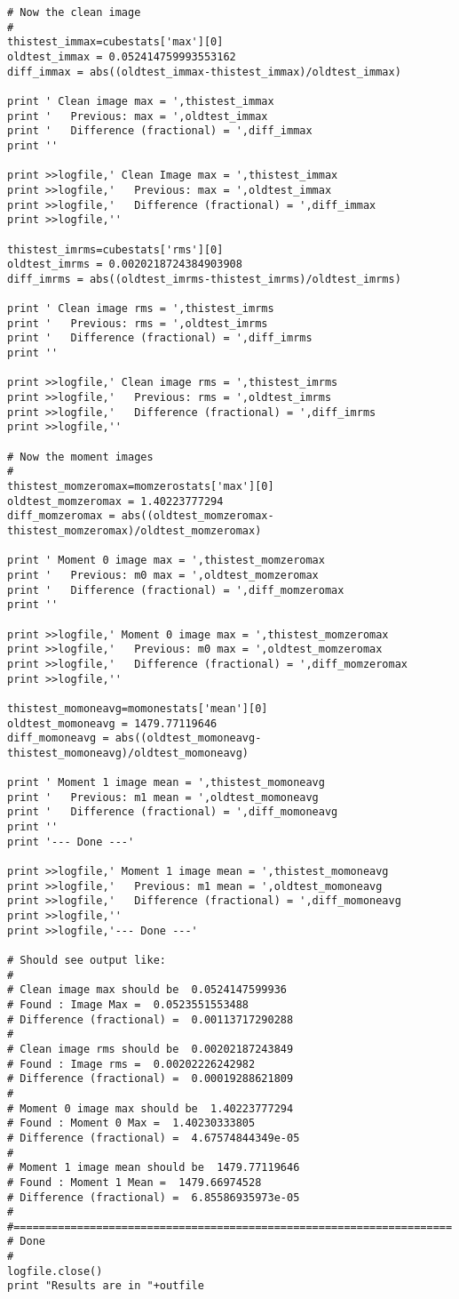 \begin{verbatim}
# Now the clean image
#
thistest_immax=cubestats['max'][0]
oldtest_immax = 0.052414759993553162
diff_immax = abs((oldtest_immax-thistest_immax)/oldtest_immax)

print ' Clean image max = ',thistest_immax
print '   Previous: max = ',oldtest_immax
print '   Difference (fractional) = ',diff_immax
print ''

print >>logfile,' Clean Image max = ',thistest_immax
print >>logfile,'   Previous: max = ',oldtest_immax
print >>logfile,'   Difference (fractional) = ',diff_immax
print >>logfile,''

thistest_imrms=cubestats['rms'][0]
oldtest_imrms = 0.0020218724384903908
diff_imrms = abs((oldtest_imrms-thistest_imrms)/oldtest_imrms)

print ' Clean image rms = ',thistest_imrms
print '   Previous: rms = ',oldtest_imrms
print '   Difference (fractional) = ',diff_imrms
print ''

print >>logfile,' Clean image rms = ',thistest_imrms
print >>logfile,'   Previous: rms = ',oldtest_imrms
print >>logfile,'   Difference (fractional) = ',diff_imrms
print >>logfile,''

# Now the moment images
#
thistest_momzeromax=momzerostats['max'][0]
oldtest_momzeromax = 1.40223777294
diff_momzeromax = abs((oldtest_momzeromax-thistest_momzeromax)/oldtest_momzeromax)

print ' Moment 0 image max = ',thistest_momzeromax
print '   Previous: m0 max = ',oldtest_momzeromax
print '   Difference (fractional) = ',diff_momzeromax
print ''

print >>logfile,' Moment 0 image max = ',thistest_momzeromax
print >>logfile,'   Previous: m0 max = ',oldtest_momzeromax
print >>logfile,'   Difference (fractional) = ',diff_momzeromax
print >>logfile,''

thistest_momoneavg=momonestats['mean'][0]
oldtest_momoneavg = 1479.77119646
diff_momoneavg = abs((oldtest_momoneavg-thistest_momoneavg)/oldtest_momoneavg)

print ' Moment 1 image mean = ',thistest_momoneavg
print '   Previous: m1 mean = ',oldtest_momoneavg
print '   Difference (fractional) = ',diff_momoneavg
print ''
print '--- Done ---'

print >>logfile,' Moment 1 image mean = ',thistest_momoneavg
print >>logfile,'   Previous: m1 mean = ',oldtest_momoneavg
print >>logfile,'   Difference (fractional) = ',diff_momoneavg
print >>logfile,''
print >>logfile,'--- Done ---'

# Should see output like:
#
# Clean image max should be  0.0524147599936
# Found : Image Max =  0.0523551553488
# Difference (fractional) =  0.00113717290288
#
# Clean image rms should be  0.00202187243849
# Found : Image rms =  0.00202226242982
# Difference (fractional) =  0.00019288621809
#
# Moment 0 image max should be  1.40223777294
# Found : Moment 0 Max =  1.40230333805
# Difference (fractional) =  4.67574844349e-05
#
# Moment 1 image mean should be  1479.77119646
# Found : Moment 1 Mean =  1479.66974528
# Difference (fractional) =  6.85586935973e-05
#
#=====================================================================
# Done
#
logfile.close()
print "Results are in "+outfile
\end{verbatim}
\normalsize

